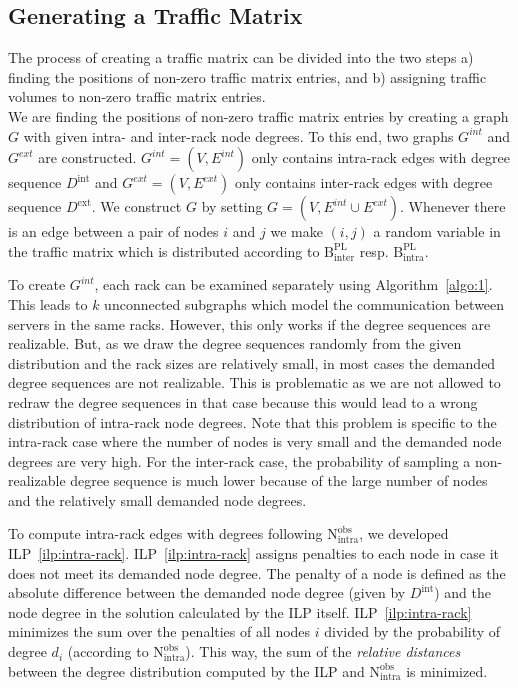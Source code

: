 \documentclass[journal,10pt]{IEEEtran}
\newcommand{\bytes}[2]{\ensuremath{\mathrm{B}^{\mathrm{#1}}_{\mathrm{#2}}}}
\newcommand{\partners}[2]{\ensuremath{\mathrm{N}^{\mathrm{#1}}_{\mathrm{#2}}}}
\begin{document}
		
		
	\subsection{Generating a Traffic Matrix}
	\label{sec:ILPs}
		The process of creating a traffic matrix can be divided into the two steps 
		a) finding the positions of non-zero traffic matrix entries, and
		b) assigning traffic volumes to non-zero traffic matrix entries.\\
		We are finding the positions of non-zero traffic matrix entries by creating a graph $G$ with given intra- and inter-rack node degrees.
		To this end, two graphs $G^{int}$ and $G^{ext}$ are constructed. 
		$G^{int} = (V, E^{int})$ only contains intra-rack edges with degree sequence $D^{\mathrm{int}}$ and
		$G^{ext} = (V, E^{ext})$ only contains inter-rack edges with degree sequence $D^{\mathrm{ext}}$. 
		We construct $G$ by setting $G = \left(V, E^{int} \cup E^{ext}\right)$.
		Whenever there is an edge between a pair of nodes $i$ and $j$ we make $(i,j)$ a random variable in the traffic matrix which is distributed 
		according to  \bytes{PL}{inter} resp. \bytes{PL}{intra}.

		
		To create $G^{int}$, each rack can be examined separately using Algorithm~\ref{algo:1}.
		This leads to $k$ unconnected subgraphs which model the communication between servers in the same racks.
		However, this only works if the degree sequences are realizable.
		But, as we draw the degree sequences randomly from the given distribution and the rack sizes are relatively small,
		in most cases the demanded degree sequences are not realizable.
		This is problematic as we are not allowed to redraw the degree sequences in that case because this would
		lead to a wrong distribution of intra-rack node degrees.
		Note that this problem is specific to the intra-rack case where the number of nodes is very small and the demanded node degrees are
		very high. 
		For the inter-rack case,
		the probability of sampling a non-realizable degree sequence is much lower because of the large number of nodes and the relatively
		small demanded node degrees. 
		
		To compute intra-rack edges with degrees following \partners{obs}{intra},
		we developed ILP~\ref{ilp:intra-rack}.
		ILP~\ref{ilp:intra-rack} assigns penalties to each node in case it does not meet its demanded node degree.
		The penalty of a node is defined as the absolute difference between the demanded node degree (given by $D^{\mathrm{int}}$) 
		and the node degree in the solution calculated by the ILP itself.
		ILP~\ref{ilp:intra-rack} minimizes the sum over the penalties of all nodes $i$
		divided by the probability of degree $d_i$ (according to \partners{obs}{intra}).
		This way, the sum of the \emph{relative distances} between the degree distribution computed by the ILP and
		\partners{obs}{intra} is minimized.
		
\end{document}
